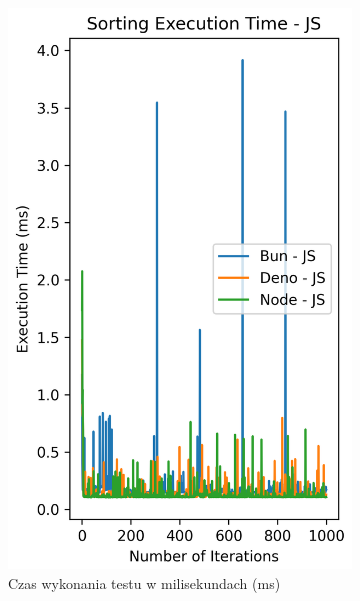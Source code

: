 \begin{figure}[H]
  \centering
  \begin{subfigure}[b]{0.42\textwidth}
    \centering
    \includegraphics[width=\textwidth]{Figures/sorting/sorting_radix_1000_1000_js_time.png}
    \caption{Czas wykonania testu w milisekundach (ms)}
    \label{fig:radix_sorting_e2_time}
  \end{subfigure}
  \begin{subfigure}[b]{0.42\textwidth}
    \centering

\end{subfigure}
\end{figure}
